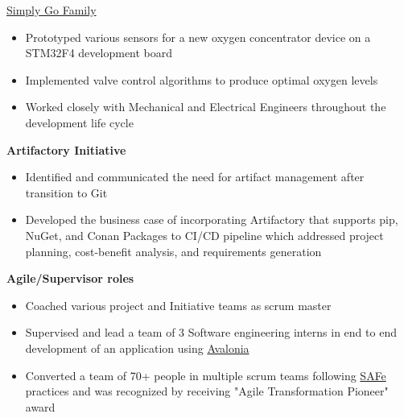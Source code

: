 \begin{cventries}
{\begin{cvitems}
{\begin{itemize}
    \end{itemize} 
}
\item 
{
    \href{https://www.usa.philips.com/healthcare/product/HCNOCTN350/simplygo-mini-portable-oxygen-concentrator-poc}{\color{RoyalBlue}Simply Go Family} 
    \begin{itemize}
        \item Prototyped various sensors for a new oxygen concentrator device on a STM32F4 development board 
        \item Implemented valve control algorithms to produce optimal oxygen levels 
        \item Worked closely with Mechanical and Electrical Engineers throughout the development life cycle 
    \end{itemize} 
}
\item 
{
    \textbf{Artifactory Initiative}
    \begin{itemize}
        \item Identified and communicated the need for artifact management after transition to Git
        \item Developed the business case of incorporating Artifactory that supports pip, NuGet, and Conan Packages to CI/CD pipeline which addressed 
        project planning, cost-benefit analysis, and requirements generation
    \end{itemize} 
}
\item 
{
    \textbf{Agile/Supervisor roles} 
    \begin{itemize}
        \item Coached various project and Initiative teams as scrum master 
        \item Supervised and lead a team of 3 Software engineering interns in end to end development of an application using \href{https://avaloniaui.net/}{\color{RoyalBlue}Avalonia}
        \item Converted a team of 70+ people in multiple scrum teams following \href{https://www.scaledagileframework.com/}{\color{RoyalBlue}SAFe} practices and was
        recognized by receiving "Agile Transformation Pioneer" award
    \end{itemize} 
}
\end{cvitems}
}




\end{cventries}
